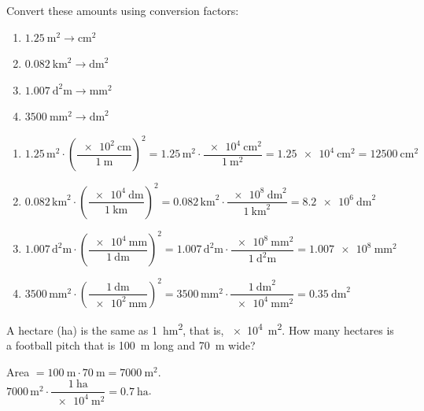 \begin{exercise}
    Convert these amounts using conversion factors:
    \begin{enumerate}[label=\letraminuscula]
        \item \(\qty{1.25}{\square\m} \to \unit{\square\cm}\)
        \item \(\qty{0.082}{\square\km} \to \unit{\square\dm}\)
        \item \(\qty{1.007}{\square\deca\metre} \to \unit{\square\mm}\)
        \item \(\qty{3500}{\square\mm} \to \unit{\square\dm}\)
    \end{enumerate}
    \begin{solu}
        \begin{enumerate}[label=\alph*)]
            \item \(\num{1.25}\,\unit{\square\m} \cdot \left(\dfrac{\qty{e2}{\cm}}{\qty{1}{\m}}\right)^{2} = \num{1.25}\,\unit{\square\m} \cdot \dfrac{\qty{e4}{\square\cm}}{\qty{1}{\square\m}} = \qty{1.25e4}{\square\cm} = \qty{12500}{\square\cm}\)
            \item \(\num{0.082}\,\unit{\square\km} \cdot \left(\dfrac{\qty{e4}{\dm}}{\qty{1}{\km}}\right)^{2} = \num{0.082}\,\unit{\square\km} \cdot \dfrac{\qty{e8}{\square\dm}}{\qty{1}{\square\km}} = \qty{8.2e6}{\square\dm}\)
            \item \(\num{1.007}\,\unit{\square\deca\m} \cdot \left(\dfrac{\qty{e4}{\mm}}{\qty{1}{\deca\m}}\right)^{2} = \num{1.007}\,\unit{\square\deca\m} \cdot \dfrac{\qty{e8}{\square\mm}}{\qty{1}{\square\deca\m}} = \qty{1.007e8}{\square\mm}\)
            \item \(\num{3500}\,\unit{\square\mm} \cdot \left(\dfrac{\qty{1}{\dm}}{\qty{e2}{\mm}}\right)^{2} = \num{3500}\,\unit{\square\mm} \cdot \dfrac{\qty{1}{\square\dm}}{\qty{e4}{\square\mm}} = \qty{0.35}{\square\dm}\)
        \end{enumerate}
    \end{solu}
\end{exercise}

\begin{exercise}
    A hectare (\unit{\hectare}) is the same as \qty{1}{\square\hecto\m}, that is, \qty{e4}{\square\m}. How many hectares is a football pitch that is \qty{100}{\m} long and \qty{70}{\m} wide?
    \begin{solu}
        Area \(= \qty{100}{\m} \cdot \qty{70}{\m} = \qty{7000}{\square\m}\). \\
        \(\num{7000}\,\unit{\square\m} \cdot \dfrac{\qty{1}{\hectare}}{\qty{e4}{\square\m}} = \qty{0.7}{\hectare}\).
    \end{solu}
\end{exercise}

